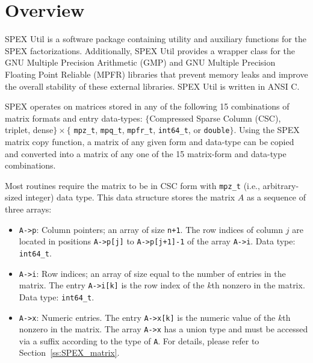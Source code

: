 \documentclass[12pt]{report}
\theoremstyle{definition}
\begin{document}
\section{Overview} \label{s:util:overview}

SPEX Util is a software package containing utility and auxiliary functions for the SPEX 
factorizations. Additionally, SPEX Util provides a wrapper class for
the GNU Multiple Precision Arithmetic (GMP) \cite{granlund2015gnu} and GNU
Multiple Precision Floating Point Reliable (MPFR) \cite{fousse2007mpfr}
libraries that prevent memory leaks and improve the overall stability of
these external libraries. SPEX Util is written in ANSI C.

SPEX operates on matrices stored in any of the following 15 combinations of matrix formats and entry data-types: 
$\{$Compressed Sparse Column (CSC), triplet, dense$\} \times \{$ \verb|mpz_t|,
\verb|mpq_t|, \verb|mpfr_t|, \verb|int64_t|, or \verb|double|$\}$. Using the SPEX matrix copy function, a matrix of any given form and data-type can be copied and converted into a matrix of any one of the 15 matrix-form and data-type combinations.

Most routines require the matrix to be in CSC form with \verb|mpz_t| (i.e., arbitrary-sized integer) data
type. This data structure stores the matrix $A$ as a sequence of three arrays:

\begin{itemize}
\item
\verb|A->p|: Column pointers; an array of size \verb|n+1|. The row indices of
column $j$ are located in positions \verb|A->p[j]| to \verb|A->p[j+1]-1| of the
array \verb|A->i|. Data type: \verb|int64_t|.

\item
\verb|A->i|: Row indices; an array of size equal to the number of entries in
the matrix. The entry \verb|A->i[k]| is the row index of the $k$th nonzero in
the matrix. Data type: \verb|int64_t|.

\item
\verb|A->x|: Numeric entries. The entry \verb|A->x[k]| is the numeric value of
the $k$th nonzero in the matrix.  The array \verb|A->x| has a union type and
must be accessed via a suffix according to the type of \verb|A|.  For details,
please refer to Section~\ref{ss:SPEX_matrix}.

\end{itemize}
\end{document}
